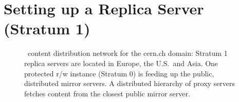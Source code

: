 \chapter{Setting up a Replica Server (Stratum 1)}
\label{sct:replica}

\begin{figure}
	\begin{center}
		\resizebox{\textwidth}{!}{}
	\end{center}
	\caption{\cvmfs\ content distribution network for the cern.ch domain: Stratum 1 replica servers are located in Europe, the U.S.\ and Asia.  
		One protected r/w instance (Stratum 0) is feeding up the public, distributed mirror servers. 
		A distributed hierarchy of proxy servers fetches content from the closest public mirror server.}
	\label{fig:stratum1}
\end{figure}
